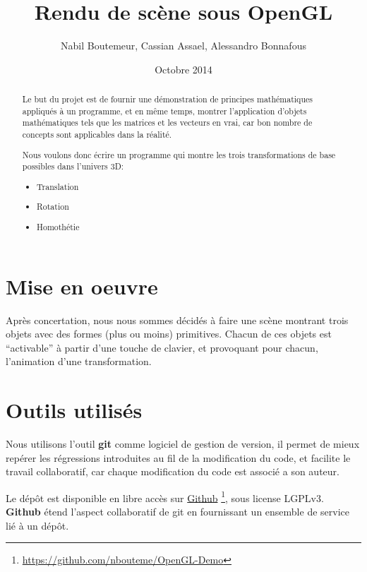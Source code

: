\documentclass[pdftex, 11pt, a4paper, titlepage]{article}
\begin{document}
\title{Rendu de scène sous OpenGL}
\author{Nabil Boutemeur,
         Cassian Assael,
   Alessandro Bonnafous} 
\date{Octobre 2014}
\maketitle

\setcounter{tocdepth}{4}
\setcounter{secnumdepth}{-1}
\tableofcontents
\setlength{\parskip}{0.5em}
\pagebreak

\begin{abstract}
  Le but du projet est de fournir une démonstration de principes
  mathématiques appliqués à un programme, et en même temps, montrer
  l'application d'objets mathématiques tels que les matrices et les
  vecteurs en vrai, car bon nombre de concepts sont applicables dans
  la réalité.

  Nous voulons donc écrire un programme qui montre les trois
  transformations de base possibles dans l'univers 3D:
  \begin{itemize}
  \item Translation
  \item Rotation
  \item Homothétie
  \end{itemize}
\end{abstract}
\pagebreak
\section*{Mise en oeuvre}

Après concertation, nous nous sommes décidés à faire une scène
montrant trois objets avec des formes (plus ou moins) primitives.
Chacun de ces objets est ``activable'' à partir d'une touche de
clavier, et provoquant pour chacun, l'animation d'une transformation.

\section*{Outils utilisés}

Nous utilisons l'outil \textbf{git} comme logiciel de gestion de
version, il permet de mieux repérer les régressions introduites au fil
de la modification du code, et facilite le travail collaboratif, car
chaque modification du code est associé a son auteur.

Le dépôt est disponible en libre accès sur
\href{https://github.com/nbouteme/OpenGL-Demo}{{\color{blue}Github}}
\footnote{\url{https://github.com/nbouteme/OpenGL-Demo}},
sous license LGPLv3.  \textbf{Github} étend l'aspect collaboratif de
git en fournissant un ensemble de service lié à un dépôt.
\end{document}
